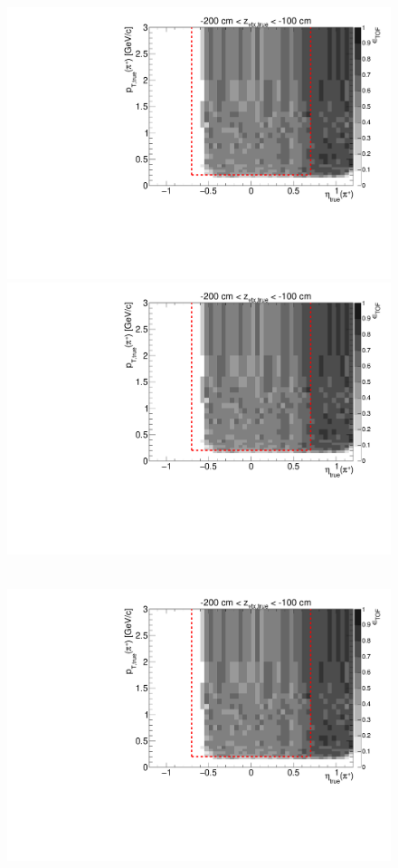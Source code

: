 \begin{figure}[hb]
{  \includegraphics[width=\linewidth,page=7]{graphics/eff/Eff2D_TOF_pion_Plus.pdf}\\
  \includegraphics[width=\linewidth,page=9]{graphics/eff/Eff2D_TOF_pion_Plus.pdf}
}~
\parbox{0.495\textwidth}{
  \centering
  \includegraphics[width=\linewidth,page=4]{graphics/eff/Eff2D_TOF_pion_Plus.pdf}\\
}
\end{figure}

